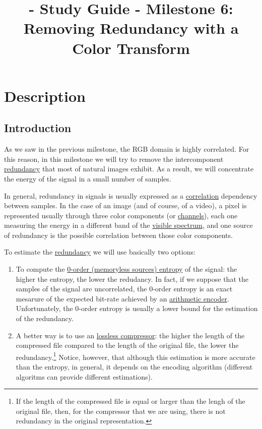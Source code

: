 
\title{\SM{} - Study Guide - Milestone 6: Removing Redundancy with a Color Transform}

\maketitle

\tableofcontents

\section{Description}

\subsection{Introduction}
As we saw in the previous milestone, the RGB domain is highly
correlated. For this reason, in this milestone we will try to remove
the intercomponent
\href{https://en.wikipedia.org/wiki/Data_redundancy}{redundancy} that
most of natural images exhibit. As a result, we will concentrate the
energy of the signal in a small number of samples.

In general, redundancy in signals is usually expressed as a
\href{https://en.wikipedia.org/wiki/Correlation_and_dependence}{correlation}
dependency between samples. In the case of an image (and of course, of
a video), a pixel is represented usually through three color components
(or \href{https://en.wikipedia.org/wiki/Color_image}{channels}), each
one measuring the energy in a different band of the
\href{https://en.wikipedia.org/wiki/Visible_spectrum}{visible
  spectrum}, and one source of redundancy is the possible correlation
between those color components.

To estimate the
\href{https://en.wikipedia.org/wiki/Redundancy_(information_theory)}{redundancy}
we will use basically two options:
\begin{enumerate}
\item To compute the
  \href{https://en.wikipedia.org/wiki/Entropy_(information_theory)}{0-order
    (memoryless sources) entropy} of the signal: the higher the
  entropy, the lower the redudancy. In fact, if we suppose that the
  samples of the signal are uncorrelated, the 0-order entropy is an
  exact mesarure of the expected bit-rate achieved by an
  \href{https://en.wikipedia.org/wiki/Arithmetic_coding}{arithmetic
    encoder}.  Unfortunately, the 0-order entropy is usually a lower
  bound for the estimation of the redundancy.
\item A better way is to use an
  \href{https://en.wikipedia.org/wiki/Data_compression}{lossless
    compressor}: the higher the length of the compressed file compared
  to the length of the original file, the lower the
  redundancy.\footnote{If the length of the compressed file is equal or
  larger than the lengh of the original file, then, for the compressor
  that we are using, there is not redundancy in the original
  representation.} Notice, however, that although this estimation is
  more accurate than the entropy, in general, it depends on the
  encoding algorithm (different algoritms can provide different
  estimations).
\end{enumerate}

